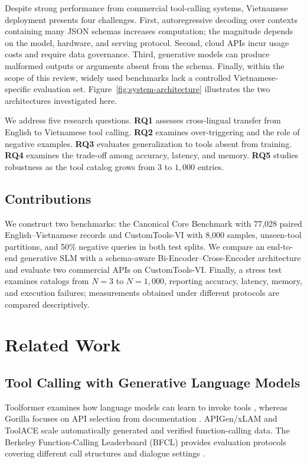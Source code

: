 \documentclass[10pt,twocolumn,a4paper]{article}
\begin{document}
Despite strong performance from commercial tool-calling systems, Vietnamese deployment presents four challenges. First, autoregressive decoding over contexts containing many JSON schemas increases computation; the magnitude depends on the model, hardware, and serving protocol. Second, cloud APIs incur usage costs and require data governance. Third, generative models can produce malformed outputs or arguments absent from the schema. Finally, within the scope of this review, widely used benchmarks lack a controlled Vietnamese-specific evaluation set. Figure~\ref{fig:system-architecture} illustrates the two architectures investigated here.

We address five research questions. \textbf{RQ1} assesses cross-lingual transfer from English to Vietnamese tool calling. \textbf{RQ2} examines over-triggering and the role of negative examples. \textbf{RQ3} evaluates generalization to tools absent from training. \textbf{RQ4} examines the trade-off among accuracy, latency, and memory. \textbf{RQ5} studies robustness as the tool catalog grows from $3$ to $1{,}000$ entries.

\subsection{Contributions}
We construct two benchmarks: the Canonical Core Benchmark with 77,028 paired English--Vietnamese records and CustomTools-VI with 8,000 samples, unseen-tool partitions, and 50\% negative queries in both test splits. We compare an end-to-end generative SLM with a schema-aware Bi-Encoder--Cross-Encoder architecture and evaluate two commercial APIs on CustomTools-VI. Finally, a stress test examines catalogs from $N=3$ to $N=1{,}000$, reporting accuracy, latency, memory, and execution failures; measurements obtained under different protocols are compared descriptively.

\section{Related Work}

\subsection{Tool Calling with Generative Language Models}
Toolformer examines how language models can learn to invoke tools \cite{schick2023toolformer}, whereas Gorilla focuses on API selection from documentation \cite{patil2023gorilla}. APIGen/xLAM \cite{liu2024apigen} and ToolACE \cite{liu2024toolace} scale automatically generated and verified function-calling data. The Berkeley Function-Calling Leaderboard (BFCL) provides evaluation protocols covering different call structures and dialogue settings \cite{yan2024bfcl}.
\end{document}

